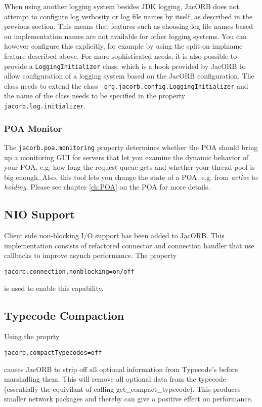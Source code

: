 When using another logging system besides JDK logging, JacORB does not
attempt to configure log verbosity or log file names by itself, as
described in the previous section.  This means that features such as
choosing log file names based on implementation names are not
available for other logging systems.  You can however configure this
explicitly, for example by using the split-on-implname feature
described above.  For more sophisticated needs, it is also possible to
provide a {\tt LoggingInitializer} class, which is a hook provided by
JacORB to allow configuration of a logging system based on the JacORB
configuration.  The class needs to extend the class {\tt
  org.jacorb.config.LoggingInitializer} and the name of the class
needs to be specified in the property {\tt jacorb.log.initializer}.

\subsubsection{POA Monitor}

The  {\tt jacorb.poa.monitoring} property  determines whether  the POA
should bring up a monitoring GUI  for servers that let you examine the
dynamic behavior of  your POA, e.g.  how long  the request queue gets
and whether your thread pool is  big enough.  Also, this tool lets you
change the  state of a POA,  e.g. from {\it active}  to {\it holding}.
Please see chapter \ref{ch:POA} on the POA for more details.

\subsection{NIO Support}
Client side non-blocking I/O support has been added to JacORB. This
implementation consists of refactored connector and connection handler that
use callbacks to improve asynch performance. The property
\begin{verbatim}
jacorb.connection.nonblocking=on/off
\end{verbatim}
is used to enable this capability.

\subsection{Typecode Compaction}
\label{compact-typecode}
Using the proprty
\begin{verbatim}
jacorb.compactTypecodes=off
\end{verbatim}
causes JacORB to strip off all optional information from Typecode's before marshalling them.
This will remove all optional data from the typecode (essentially the equivilant of
calling get\_compact\_typecode). This produces smaller network packages and thereby can give a positive effect on performance.

